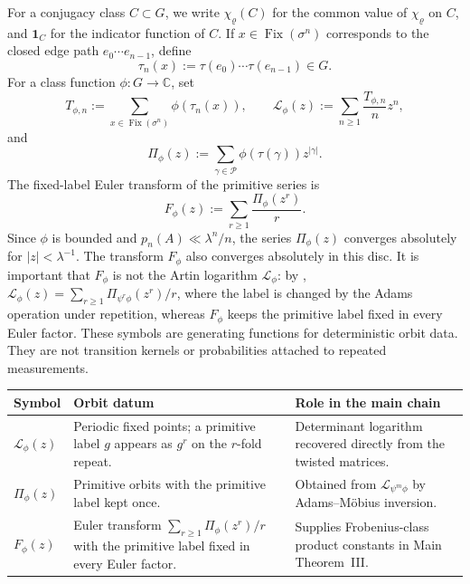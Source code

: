 \documentclass[11pt,a4paper]{amsart}
\theoremstyle{plain}
\theoremstyle{definition}
\theoremstyle{remark}
\newcommand{\CC}{\mathbb{C}}
\newcommand{\cP}{\mathcal P}
\begin{document}
For a conjugacy class \(C\subset G\), we write \(\chi_\varrho(C)\) for
the common value of \(\chi_\varrho\) on \(C\), and \(\mathbf 1_C\) for
the indicator function of \(C\). If \(x\in\operatorname{Fix}(\sigma^n)\)
corresponds to the closed edge path \(e_0\cdots e_{n-1}\), define
\[
  \tau_n(x):=\tau(e_0)\cdots\tau(e_{n-1})\in G.
\]
For a class function \(\phi:G\to\CC\), set
\begin{equation}\label{eq:class-logarithm-def}
  T_{\phi,n}:=\sum_{x\in\operatorname{Fix}(\sigma^n)}\phi(\tau_n(x)),
  \qquad
  \mathcal L_\phi(z):=\sum_{n\ge 1}\frac{T_{\phi,n}}{n}z^n,
\end{equation}
and
\begin{equation}\label{eq:primitive-class-series-def}
  \Pi_\phi(z):=\sum_{\gamma\in\cP}\phi(\tau(\gamma))z^{|\gamma|}.
\end{equation}
The fixed-label Euler transform of the primitive series is
\begin{equation}\label{eq:fixed-label-euler-transform-def}
  F_\phi(z):=\sum_{r\ge1}\frac{\Pi_\phi(z^r)}{r}.
\end{equation}
Since \(\phi\) is bounded and \(p_n(A)\ll \lambda^n/n\), the series
\(\Pi_\phi(z)\) converges absolutely for \(|z|<\lambda^{-1}\).
The transform \(F_\phi\) also converges absolutely in this disc. It is
important that \(F_\phi\) is not the Artin logarithm
\(\mathcal L_\phi\): by ,
\(\mathcal L_\phi(z)=\sum_{r\ge1}\Pi_{\psi^r\phi}(z^r)/r\), where the
label is changed by the Adams operation under repetition, whereas
\(F_\phi\) keeps the primitive label fixed in every Euler factor.
These symbols are generating functions for deterministic orbit data.
They are not transition kernels or probabilities attached to repeated
measurements.

\begin{center}
\renewcommand{\arraystretch}{1.18}
\begin{tabular}{L{0.25\textwidth}L{0.32\textwidth}L{0.34\textwidth}}
\toprule
Symbol & Orbit datum & Role in the main chain \\
\midrule
\(\mathcal L_\phi(z)\)
& Periodic fixed points; a primitive label \(g\) appears as \(g^r\) on
the \(r\)-fold repeat.
& Determinant logarithm recovered directly from the twisted matrices. \\
\(\Pi_\phi(z)\)
& Primitive orbits with the primitive label kept once.
& Obtained from \(\mathcal L_{\psi^m\phi}\) by Adams--M\"obius
inversion. \\
\(F_\phi(z)\)
& Euler transform \(\sum_{r\ge1}\Pi_\phi(z^r)/r\) with the primitive label
fixed in every Euler factor.
& Supplies Frobenius-class product constants in Main Theorem~III. \\
\bottomrule
\end{tabular}
\end{center}
\end{document}
